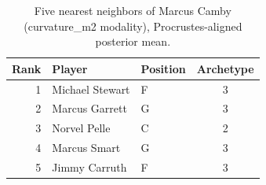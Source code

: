\begin{table}[htbp]
  \centering\small
  \begin{tabular}{rllc}
    \toprule
    Rank & Player & Position & Archetype \\
    \midrule
    1 & Michael Stewart & F & 3 \\
    2 & Marcus Garrett & G & 3 \\
    3 & Norvel Pelle & C & 2 \\
    4 & Marcus Smart & G & 3 \\
    5 & Jimmy Carruth & F & 3 \\
    \bottomrule
  \end{tabular}
  \caption{Five nearest neighbors of Marcus Camby (curvature_m2 modality), Procrustes-aligned posterior mean.}
  \label{tab:Marcus_Camby_neighbors_curvature_m2}
\end{table}

